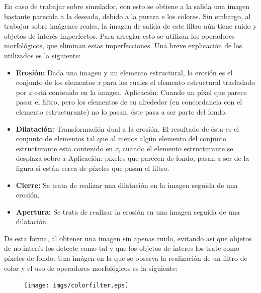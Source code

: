 \hspace{1 cm} En caso de trabajar sobre simulador, con esto se obtiene a la salida una imagen bastante parecida a la deseada, debido a la pureza e los colores. Sin embargo, al trabajar sobre im\'agenes reales, la imagen de salida de este filtro a\'un tiene ruido y objetos de inter\'es imperfectos. Para arreglar esto se utilizan los operadores morfol\'ogicos, que eliminan estas imperfecciones. Una breve explicaci\'on de los utilizados es la siguiente: 

\begin{itemize}
	\item \textbf{Erosi\'on:} Dada una imagen y un elemento estructural, la erosi\'on es el conjunto de los elementos \textit{x} para los cuales el elemento estructural trasladado por \textit{x} est\'a contenido en la imagen. 
	\newline\hspace{1 cm} Aplicaci\'on: Cuando un p\'ixel que parece pasar el filtro, pero los elementos de su alrededor (en concordancia con el elemento estructurante) no lo pasan, \'este pasa a ser parte del fondo. 
	\item \textbf{Dilataci\'on:} Transformaci\'on dual a la erosi\'on. El resultado de \'esta es el conjunto de elementos tal que al menos alg\'un elemento del conjunto estructurante esta contenido en \textit{x}, cuando el elemento estructurante se desplaza sobre \textit{x}
	\newline\hspace{1 cm} Aplicaci\'on: p\'ixeles que parecen de fondo, pasan a ser de la figura si est\'an cerca de p\'ixeles que pasan el filtro.
	\item \textbf{Cierre:} Se trata de realizar una dilataci\'on en la imagen seguida de una erosi\'on.
	\item \textbf{Apertura:} Se trata de realizar la erosi\'on en una imagen seguida de una dilataci\'on.
\end{itemize}


\hspace{1 cm} De esta forma, al obtener una imagen sin apenas ruido, evitando as\'i que objetos de no inter\'es los detecte como tal y que los objetos de interes los trate como p\'ixeles de fondo. Una im\'agen en la que se observa la realizaci\'on de un filtro de color y el uso de operadores morfol\'ogicos es la siguiente:

\begin{figure}[ht]
	\centering
		\texttt{[image: imgs/colorfilter.eps]}
	\label{fig:E_Imagen_baliza}
\end{figure}


